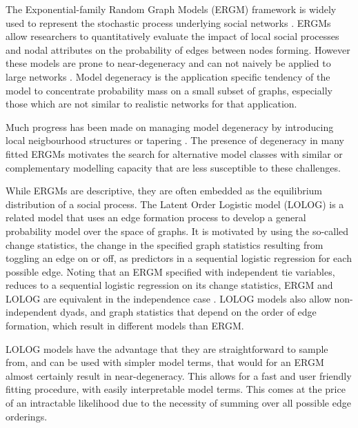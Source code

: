 \documentclass[
]{statsoc}
\begin{document}
The Exponential-family Random Graph Models (ERGM) framework is widely
used to represent the stochastic process underlying social networks
\citep{FrankStrauss1986,Hunter2006}. ERGMs allow researchers to
quantitatively evaluate the impact of local social processes and nodal
attributes on the probability of edges between nodes forming. However
these models are prone to near-degeneracy \citep{Handcock2003} and can
not naively be applied to large networks
\citep{schweinberger2011,chatterjee2013}. Model degeneracy is the
application specific tendency of the model to concentrate probability
mass on a small subset of graphs, especially those which are not similar
to realistic networks for that application.

Much progress has been made on managing model degeneracy by introducing
local neigbourhood structures \citep{schweinbergerhandcock2015} or
tapering \citep{fellowshandcock2017}. The presence of degeneracy in many
fitted ERGMs motivates the search for alternative model classes with
similar or complementary modelling capacity that are less susceptible to
these challenges.

While ERGMs are descriptive, they are often embedded as the equilibrium
distribution of a social process. The Latent Order Logistic model
(LOLOG) \citep{Fellows2018} is a related model that uses an edge
formation process to develop a general probability model over the space
of graphs. It is motivated by using the so-called change statistics, the
change in the specified graph statistics resulting from toggling an edge
on or off, as predictors in a sequential logistic regression for each
possible edge. Noting that an ERGM specified with independent tie
variables, reduces to a sequential logistic regression on its change
statistics, ERGM and LOLOG are equivalent in the independence case
\citep{Fellows2018}. LOLOG models also allow non-independent dyads, and
graph statistics that depend on the order of edge formation, which
result in different models than ERGM.

LOLOG models have the advantage that they are straightforward to sample
from, and can be used with simpler model terms, that would for an ERGM
almost certainly result in near-degeneracy. This allows for a fast and
user friendly fitting procedure, with easily interpretable model terms.
This comes at the price of an intractable likelihood due to the
necessity of summing over all possible edge orderings.
\end{document}
